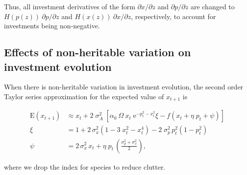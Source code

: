 
Thus, all investment derivatives of the form $\partial x / \partial z$
and $\partial p / \partial z$
are changed to $H(p(z)) \: \partial p / \partial z$ and
$H(x(z)) \: \partial x / \partial z$, respectively, to
account for investments being non-negative.


\subsection*{Effects of non-heritable variation on investment
evolution}

When there is non-heritable variation in investment evolution, the second
order Taylor series approximation for the expected value of
\(x_{t + 1}\) is


\begin{equation}
\label{eq:taylor-expansion-final}
\begin{split}
    \text{E}(x_{t+1}) & \approx
        x_{t} + 2 \; \sigma_A^2 \; \left[
            \alpha_0 \: \Omega \: x_{t} \; \text{e}^{-p_{t}^2 - x_{t}^2} \xi - 
            f \left( x_{t} + \eta \; p_{t} + \psi \right)
        \right] \\
    \xi & = 1 + 2\, \sigma^2_{x} \left( 1 - 3 \; x_{t}^2 - x_t^4 \right) - 
        2 \; \sigma^2_{p} \, p_{t}^2 \left( 1 - p_{t}^2 \right) \\
    \psi & = 2 \, \sigma^2_{x} \, x_{t} + 
        \eta \; p_{t} \, \left( \frac{\sigma^2_{p} + \sigma^2_{x}}{2} \right)
\text{,}
\end{split}
\end{equation}

\noindent where we drop the index for species to reduce clutter.
